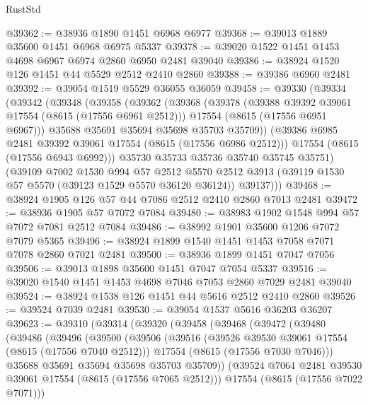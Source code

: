 \begin{lexlean}{RustStd}
\begin{coremodule}
@39362 := @38936 @1890 @1451 @6968 @6977
@39368 := @39013 @1889 @35600 @1451 @6968 @6975 @5337
@39378 := @39020 @1522 @1451 @1453 @4698 @6967 @6974 @2860 @6950 @2481 @39040
@39386 := @38924 @1520 @126 @1451 @44 @5529 @2512 @2410 @2860
@39388 := @39386 @6960 @2481
@39392 := @39054 @1519 @5529 @36055 @36059
@39458 := @39330
    (@39334
      (@39342
        (@39348
          (@39358
            (@39362
              (@39368
                (@39378
                  (@39388 @39392 @39061 @17554 (@8615 (@17556 @6961 @2512)))
                  @17554
                  (@8615 (@17556 @6951 @6967)))
                @35688
                @35691
                @35694
                @35698
                @35703
                @35709))
            (@39386 @6985 @2481 @39392 @39061 @17554 (@8615 (@17556 @6986 @2512)))
            @17554
            (@8615 (@17556 @6943 @6992)))
          @35730
          @35733
          @35736
          @35740
          @35745
          @35751)
        (@39109
          @7002
          @1530
          @994
          @57
          @2512
          @5570
          @2512
          @3913
          (@39119 @1530 @57 @5570 (@39123 @1529 @5570 @36120 @36124))
          @39137)))
@39468 := @38924 @1905 @126 @57 @44 @7086 @2512 @2410 @2860 @7013 @2481
@39472 := @38936 @1905 @57 @7072 @7084
@39480 := @38983 @1902 @1548 @994 @57 @7072 @7081 @2512 @7084
@39486 := @38992 @1901 @35600 @1206 @7072 @7079 @5365
@39496 := @38924 @1899 @1540 @1451 @1453 @7058 @7071 @7078 @2860 @7021 @2481
@39500 := @38936 @1899 @1451 @7047 @7056
@39506 := @39013 @1898 @35600 @1451 @7047 @7054 @5337
@39516 := @39020 @1540 @1451 @1453 @4698 @7046 @7053 @2860 @7029 @2481 @39040
@39524 := @38924 @1538 @126 @1451 @44 @5616 @2512 @2410 @2860
@39526 := @39524 @7039 @2481
@39530 := @39054 @1537 @5616 @36203 @36207
@39623 := @39310
    (@39314
      (@39320
        (@39458
          (@39468
            (@39472
              (@39480
                (@39486
                  (@39496
                    (@39500
                      (@39506
                        (@39516
                          (@39526 @39530 @39061 @17554 (@8615 (@17556 @7040 @2512)))
                          @17554
                          (@8615 (@17556 @7030 @7046)))
                        @35688
                        @35691
                        @35694
                        @35698
                        @35703
                        @35709))
                    (@39524 @7064 @2481 @39530 @39061 @17554 (@8615 (@17556 @7065 @2512)))
                    @17554
                    (@8615 (@17556 @7022 @7071)))

\end{coremodule}
\end{lexlean}
